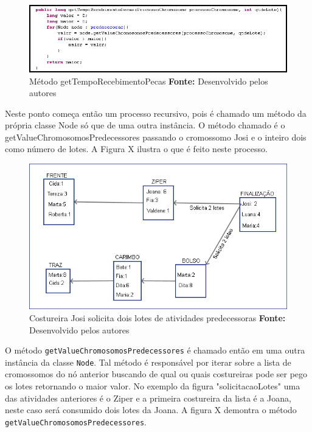 \begin{figure}[h!]
	\centerline{\includegraphics[scale=0.8]{./imagens/metodo_getTempoRecebimentoPecas.png}}
	\caption[Distribuição de trabalho]
	{Método getTempoRecebimentoPecas \textbf{Fonte:} Desenvolvido pelos autores}
	\label{fig:exemplo1}
\end{figure}

\newpage

\par Neste ponto começa então um processo recursivo, pois é chamado um método da própria classe Node só que de uma outra instância.
O método chamado é o getValueChromosomosPredecessores passando o cromossomo Josi e o inteiro dois como número de lotes. A Figura
X ilustra o que é feito neste processo.

\begin{figure}[h!]
	\centerline{\includegraphics[scale=0.6]{./imagens/processo_solciitacao_de_lotes1.png}}
	\caption[Distribuição de trabalho]
	{Costureira Josi solicita dois lotes de atividades predecessoras \textbf{Fonte:} Desenvolvido pelos autores}
	\label{fig:exemplo1}
\end{figure}

\par O método \texttt{getValueChromosomosPredecessores} é chamado então em uma outra instância da classe \texttt{Node}. Tal 
método é responsável por iterar sobre a lista de cromossomos do nó anterior buscando de qual ou quais costureiras pode ser
pego os lotes retornando o maior valor. No exemplo da figura "solicitacaoLotes" uma das atividades anteriores é o Ziper e a
primeira costureira da lista é a Joana, neste caso será consumido dois lotes da Joana. A figura X demontra o método \texttt{getValueChromosomosPredecessores}.


